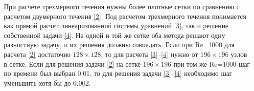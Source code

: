 При расчете трехмерного течения нужны более плотные сетки по сравнению с расчетом двумерного течения \ref{2}. Под расчетом трехмерного течения понимается как прямой расчет линеаризованной системы уравнений \ref{3}, так и решение собственной задачи \ref{4}. На одной и той же сетке оба метода решают одну разностную задачу, и их решения должны совпадать. Если при Re=1000 для расчета \ref{2} достаточно $128 \times 128$, то для расчета \ref{3}--\ref{4} нужно от $196 \times 196$ узлов в сетке. Если для решения задачи \ref{2} на сетке $196 \times 196$ при том же Re=1000 шаг по времени был выбран 0.01, то для решения задачи \ref{3}--\ref{4} необходимо шаг уменьшить хотя бы до 0.002.  
